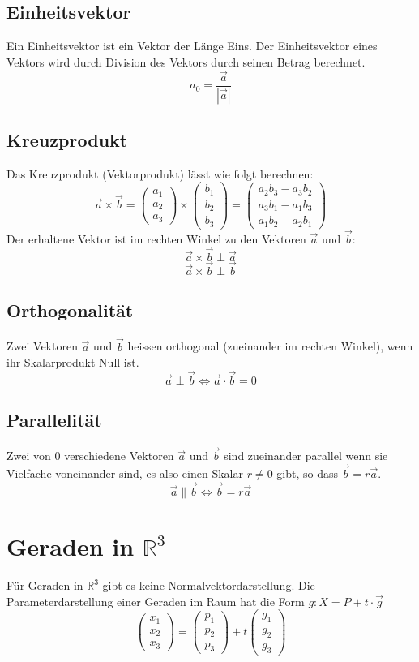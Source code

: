 \documentclass[a4paper]{article}
\begin{document}
\subsection{Einheitsvektor}
Ein Einheitsvektor ist ein Vektor der Länge Eins. Der Einheitsvektor eines Vektors wird durch Division des Vektors durch seinen Betrag berechnet.
\[
a_0 = \frac{\vec a}{|\vec a|}
\]
\subsection{Kreuzprodukt}
Das Kreuzprodukt (Vektorprodukt) lässt wie folgt berechnen:
\[
 \vec{a}\times\vec{b} = \begin{pmatrix}a_1 \\ a_2 \\ a_3 \end{pmatrix}\times\begin{pmatrix}b_1 \\ b_2 \\ b_3 \end{pmatrix} = \begin{pmatrix}a_2b_3 - a_3b_2 \\ a_3b_1 - a_1b_3 \\ a_1b_2 - a_2b_1 \end{pmatrix}
\]
Der erhaltene Vektor ist im rechten Winkel zu den Vektoren $\vec a$ und $\vec b$:
\[ \vec a \times \vec b \perp \vec a \]
\[ \vec a \times \vec b \perp \vec b \]
\subsection{Orthogonalität}
Zwei Vektoren $\vec a$ und $\vec b$ heissen orthogonal (zueinander im rechten Winkel), wenn ihr Skalarprodukt Null ist.
\[
\vec a \perp \vec b \Leftrightarrow \vec a \cdot \vec b = 0
\]
\subsection{Parallelität}
Zwei von 0 verschiedene Vektoren $\vec a$ und $\vec b$ sind zueinander parallel wenn sie Vielfache voneinander sind, es also einen Skalar $r \neq 0$ gibt, so dass $\vec b = r\vec a$.
\[
\vec a \parallel \vec b \Leftrightarrow \vec b = r \vec a
\]

\section{Geraden in $\mathbb{R}^3$}
Für Geraden in $\mathbb{R}^3$ gibt es keine Normalvektordarstellung. Die Parameterdarstellung einer Geraden im Raum hat die Form $g: X=P+t\cdot \vec g$
\[\begin{pmatrix} x_1 \\ x_2 \\ x_3\end{pmatrix}=\begin{pmatrix} p_1 \\ p_2\\ p_3 \end{pmatrix} + t\begin{pmatrix} g_1 \\ g_2\\ g_3\end{pmatrix}\]
\end{document}
